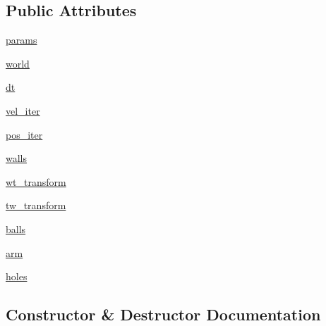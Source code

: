 \subsection*{Public Attributes}
\begin{DoxyCompactItemize}
\item 
\hyperlink{classtaxons_1_1gym__billiard_1_1utils_1_1physics_1_1_physics_sim_a792836f28bac1455384063c3f064fdf7}{params}
\item 
\hyperlink{classtaxons_1_1gym__billiard_1_1utils_1_1physics_1_1_physics_sim_a262ba965c7be78222d78a008bd6b0d69}{world}
\item 
\hyperlink{classtaxons_1_1gym__billiard_1_1utils_1_1physics_1_1_physics_sim_adeaa2a72e1091a76e796661d3186b036}{dt}
\item 
\hyperlink{classtaxons_1_1gym__billiard_1_1utils_1_1physics_1_1_physics_sim_aca4b5111de86e5cd530d1685859e1853}{vel\+\_\+iter}
\item 
\hyperlink{classtaxons_1_1gym__billiard_1_1utils_1_1physics_1_1_physics_sim_abc7faf323252aa3ee0b9c401675aa104}{pos\+\_\+iter}
\item 
\hyperlink{classtaxons_1_1gym__billiard_1_1utils_1_1physics_1_1_physics_sim_a7f4747b537ee73d6ee335daaaf3dc4ad}{walls}
\item 
\hyperlink{classtaxons_1_1gym__billiard_1_1utils_1_1physics_1_1_physics_sim_a360942bb049c2b038296f86412c44818}{wt\+\_\+transform}
\item 
\hyperlink{classtaxons_1_1gym__billiard_1_1utils_1_1physics_1_1_physics_sim_a1ea002097a81141b326c52a6f7a40d42}{tw\+\_\+transform}
\item 
\hyperlink{classtaxons_1_1gym__billiard_1_1utils_1_1physics_1_1_physics_sim_a1601991933198bd595005552b29e1669}{balls}
\item 
\hyperlink{classtaxons_1_1gym__billiard_1_1utils_1_1physics_1_1_physics_sim_a553913040048c1165ae4d3b3d936b31e}{arm}
\item 
\hyperlink{classtaxons_1_1gym__billiard_1_1utils_1_1physics_1_1_physics_sim_a2c409cdae517feea58b427dac8adc5d5}{holes}
\end{DoxyCompactItemize}


\subsection{Constructor \& Destructor Documentation}
